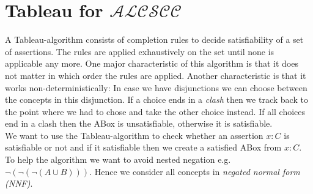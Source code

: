 \documentclass{book}
\theoremstyle{break}
\theoremstyle{definition}
\begin{document}
\chapter{Tableau for $\mathcal{ALCSCC}$}
A Tableau-algorithm consists of completion rules to decide satisfiability of a set of assertions. The rules are applied exhaustively on the set until none is applicable any more. One major characteristic of this algorithm is that it does not matter in which order the rules are applied. Another characteristic is that it works non-deterministically: In case we have disjunctions we can choose between the concepts in this disjunction. If a choice ends in a \textit{clash} then we track back to the point where we had to chose and take the other choice instead. If all choices end in a clash then the ABox is unsatisfiable, otherwise it is satisfiable.\\
We want to use the Tableau-algorithm to check whether an assertion $x:C$ is satisfiable or not and if it satisfiable then we create a satisfied ABox from $x:C$.\\
To help the algorithm we want to avoid nested negation e.g. $\neg(\neg(\neg(A\cup B)))$. Hence we consider all concepts in \textit{negated normal form (NNF)}.
\end{document}
